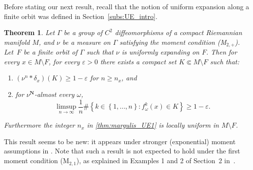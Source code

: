 \documentclass[JEP,XML,SOM,Unicode,published]{cedram}
\let\sep :
\let\e\varepsilon
\newcommand{\set}[1]{\left\{#1\right\}}
\newcommand{\unsur}[1]{\frac{1}{#1}}
\def\N{\mathbf{N}}
\theoremstyle{plain}
\newtheorem{thm}{Theorem}[section]
\theoremstyle{definition}
\begin{document}
Before stating our next result, recall that the notion of uniform expansion along a finite orbit was defined in Section~\ref{subs:UE_intro}.

\begin{thm}\label{thm:margulis_UE}
Let $\Gamma$ be a group of $C^2$ diffeomorphisms of a compact Riemannian
manifold $M$, and $\nu$ be a measure on
$\Gamma$ satisfying the moment condition (M$_{2,+}$).
Let~$F$ be a finite orbit of $\Gamma$ such that $\nu$ is uniformly expanding on $F$.
Then for every $x\in M\setminus F$, for every $\e>0$
there exists a compact set $K\Subset M\setminus F$ such that:
\begin{enumerate}
\item\label{thm:margulis_UE1} $(\nu^{n}\ast \delta_x) (K) \geq 1- \e$ for $n\geq n_x$, and
\item\label{thm:margulis_UE2} for $\nu^\N$-almost every $\omega$,
\[
\limsup_{n\to\infty} \unsur{n} \# \set{k\in \set{1, \ldots, n}\sep f^k_\omega(x) \in K} \geq 1-\e.
\]
\end{enumerate}
Furthermore the integer $n_x$ in \eqref{thm:margulis_UE1} is locally uniform in $M\setminus F$.
\end{thm}

This result seems to be new: it appears under stronger (exponential) moment assumptions
in \eg \cite{liu_thesis, chung}. Note that such a result is not expected to hold under the
first moment condition (M$_{2, 1}$), as explained in
Examples 1 and 2 of Section~2 in~\cite{benard-desaxce}.
\end{document}
